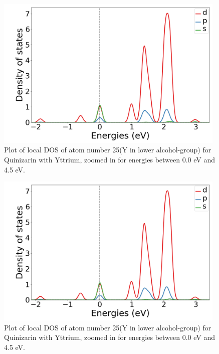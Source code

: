 \documentclass{article}
\begin{document}
      \begin{figure}[H]
        \centering
        \includegraphics[width = 11cm]{../fig/Y_LDOS25_2.png}
        \caption{Plot of local DOS of atom number 25(Y in lower alcohol-group) for Quinizarin with Yttrium, zoomed in for energies between 0.0 eV and 4.5 eV. }
        \label{fig:Y_LDOS25_2.png}
      \end{figure}

      \begin{figure}[H]
        \centering
        \includegraphics[width = 11cm]{../fig/Y_LDOS25_2.png}
        \caption{Plot of local DOS of atom number 25(Y in lower alcohol-group) for Quinizarin with Yttrium, zoomed in for energies between 0.0 eV and 4.5 eV. }
        \label{fig:Y_LDOS25_2.png}
      \end{figure}
\end{document}
